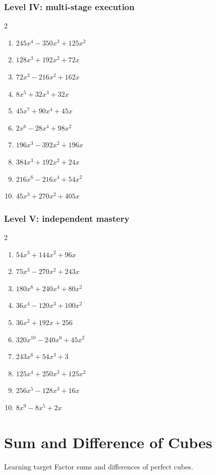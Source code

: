 \documentclass[11pt,oneside]{book}
\begin{document}
\subsection*{Level IV: multi-stage execution}
\begin{multicols}{2}
\begin{enumerate}[leftmargin=*,label=\textbf{\arabic*.},itemsep=0.65\baselineskip]
\item $ 245 x^{4} - 350 x^{3} + 125 x^{2} $
\item $ 128 x^{3} + 192 x^{2} + 72 x $
\item $ 72 x^{3} - 216 x^{2} + 162 x $
\item $ 8 x^{5} + 32 x^{3} + 32 x $
\item $ 45 x^{7} + 90 x^{4} + 45 x $
\item $ 2 x^{6} - 28 x^{4} + 98 x^{2} $
\item $ 196 x^{3} - 392 x^{2} + 196 x $
\item $ 384 x^{3} + 192 x^{2} + 24 x $
\item $ 216 x^{6} - 216 x^{4} + 54 x^{2} $
\item $ 45 x^{3} + 270 x^{2} + 405 x $
\end{enumerate}
\end{multicols}
\subsection*{Level V: independent mastery}
\begin{multicols}{2}
\begin{enumerate}[leftmargin=*,label=\textbf{\arabic*.},itemsep=0.65\baselineskip]
\item $ 54 x^{3} + 144 x^{2} + 96 x $
\item $ 75 x^{3} - 270 x^{2} + 243 x $
\item $ 180 x^{6} + 240 x^{4} + 80 x^{2} $
\item $ 36 x^{4} - 120 x^{3} + 100 x^{2} $
\item $ 36 x^{2} + 192 x + 256 $
\item $ 320 x^{10} - 240 x^{6} + 45 x^{2} $
\item $ 243 x^{6} + 54 x^{3} + 3 $
\item $ 125 x^{4} + 250 x^{3} + 125 x^{2} $
\item $ 256 x^{5} - 128 x^{3} + 16 x $
\item $ 8 x^{9} - 8 x^{5} + 2 x $
\end{enumerate}
\end{multicols}
\chapter{Sum and Difference of Cubes}
\begin{rulebox}{Learning target}
Factor sums and differences of perfect cubes.
\end{rulebox}
\end{document}
